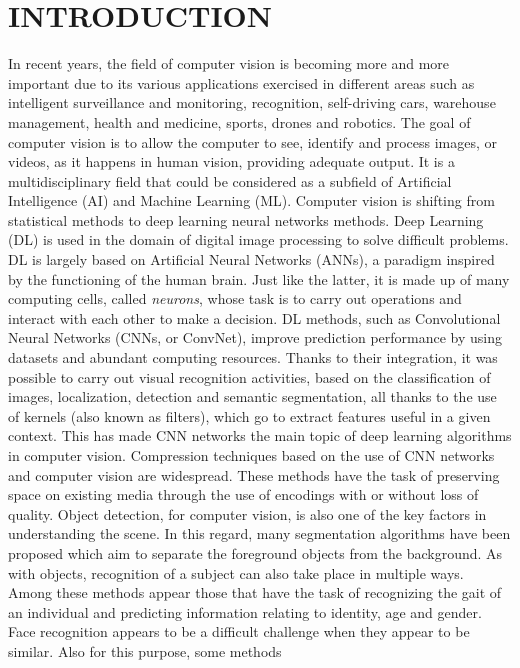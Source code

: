 \section*{INTRODUCTION}
In recent years, the field of computer vision is becoming more and more important 
due to its various applications exercised in different areas such as 
intelligent surveillance and monitoring, recognition, self-driving cars, warehouse 
management, health and medicine, sports, drones and robotics. The 
goal of computer vision is to allow the computer to see, identify and process 
images, or videos, as it happens in human vision, providing adequate output. 
It is a multidisciplinary field that could be considered as a subfield of 
Artificial Intelligence (AI) and Machine Learning (ML). Computer vision is 
shifting from statistical methods to deep learning neural networks methods. 
Deep Learning (DL) is used in the domain of digital image processing to solve 
difficult problems. DL is largely based on Artificial Neural Networks (ANNs), 
a paradigm inspired by the functioning of the human brain. Just like the latter, 
it is made up of many computing cells, called \emph{neurons}, whose task 
is to carry out operations and interact with each other to make a decision. 
DL methods, such as Convolutional Neural Networks (CNNs, or ConvNet), 
improve prediction performance by using datasets and abundant computing 
resources. Thanks to their integration, it was possible to carry out visual 
recognition activities, based on the classification of images, localization, detection 
and semantic segmentation, all thanks to the use of kernels (also 
known as filters), which go to extract features useful in a given context. This 
has made CNN networks the main topic of deep learning algorithms in computer 
vision. Compression techniques based on the use of CNN networks and 
computer vision are widespread. These methods have the task of preserving 
space on existing media through the use of encodings with or without loss of 
quality. Object detection, for computer vision, is also one of the key factors 
in understanding the scene. In this regard, many segmentation algorithms 
have been proposed which aim to separate the foreground objects from the 
background. As with objects, recognition of a subject can also take place 
in multiple ways. Among these methods appear those that have the task 
of recognizing the gait of an individual and predicting information relating 
to identity, age and gender. Face recognition appears to be a difficult challenge 
when they appear to be similar. Also for this purpose, some methods 
